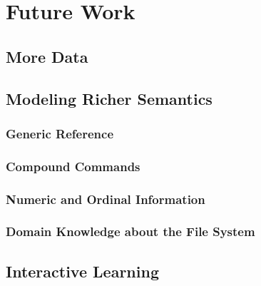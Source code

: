 \section{Future Work}

\subsection{More Data}
\subsection{Modeling Richer Semantics}
\subsubsection{Generic Reference}
\subsubsection{Compound Commands}
\subsubsection{Numeric and Ordinal Information}
\subsubsection{Domain Knowledge about the File System}

\subsection{Interactive Learning}